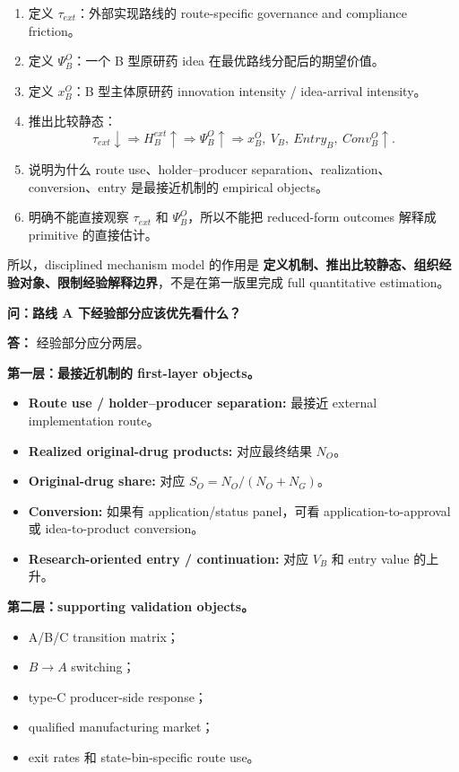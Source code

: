 \documentclass[10pt]{ctexart}
\newcommand{\qtitle}[1]{\vspace{0.35em}\noindent\textbf{问：#1}\par\vspace{0.15em}\noindent\textbf{答：}}
\newcommand{\key}[1]{\textbf{#1}}
\begin{document}
\begin{enumerate}
    \item 定义 \(\tau_{ext}\)：外部实现路线的 route-specific governance and compliance friction。
    \item 定义 \(\Psi_B^O\)：一个 B 型原研药 idea 在最优路线分配后的期望价值。
    \item 定义 \(x_B^O\)：B 型主体原研药 innovation intensity / idea-arrival intensity。
    \item 推出比较静态：
    \[
    \tau_{ext}\downarrow
    \Rightarrow
    H_B^{ext}\uparrow
    \Rightarrow
    \Psi_B^O\uparrow
    \Rightarrow
    x_B^O,\ V_B,\ Entry_B,\ Conv_B^O\uparrow.
    \]
    \item 说明为什么 route use、holder--producer separation、realization、conversion、entry 是最接近机制的 empirical objects。
    \item 明确不能直接观察 \(\tau_{ext}\) 和 \(\Psi_B^O\)，所以不能把 reduced-form outcomes 解释成 primitive 的直接估计。
\end{enumerate}

所以，disciplined mechanism model 的作用是 \key{定义机制、推出比较静态、组织经验对象、限制经验解释边界}，不是在第一版里完成 full quantitative estimation。

\qtitle{路线 A 下经验部分应该优先看什么？}
经验部分应分两层。

\key{第一层：最接近机制的 first-layer objects。}
\begin{itemize}
    \item \textbf{Route use / holder--producer separation:} 最接近 external implementation route。
    \item \textbf{Realized original-drug products:} 对应最终结果 \(N_O\)。
    \item \textbf{Original-drug share:} 对应 \(S_O=N_O/(N_O+N_G)\)。
    \item \textbf{Conversion:} 如果有 application/status panel，可看 application-to-approval 或 idea-to-product conversion。
    \item \textbf{Research-oriented entry / continuation:} 对应 \(V_B\) 和 entry value 的上升。
\end{itemize}

\key{第二层：supporting validation objects。}
\begin{itemize}
    \item A/B/C transition matrix；
    \item \(B\rightarrow A\) switching；
    \item type-C producer-side response；
    \item qualified manufacturing market；
    \item exit rates 和 state-bin-specific route use。
\end{itemize}
\end{document}
